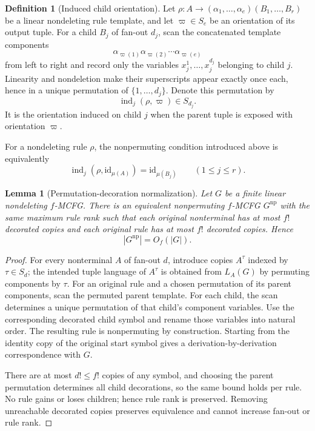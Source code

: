 \documentclass[11pt,a4paper]{article}
\numberwithin{equation}{section}
\theoremstyle{plain}
\newtheorem{lemma}[theorem]{Lemma}
\theoremstyle{definition}
\newtheorem{definition}[theorem]{Definition}
\theoremstyle{remark}
\begin{document}
\begin{definition}[Induced child orientation]
\label{def:induced-orientation}
Let
\(\rho:A\to(\alpha_1,\ldots,\alpha_e)(B_1,\ldots,B_r)\)
be a linear nondeleting rule template, and let
\(\varpi\in S_e\) be an orientation of its output tuple.  For a child \(B_j\)
of fan-out \(d_j\), scan the concatenated template components
\[
  \alpha_{\varpi(1)}\alpha_{\varpi(2)}\cdots\alpha_{\varpi(e)}
\]
from left to right and record only the variables
\(x_j^1,\ldots,x_j^{d_j}\) belonging to child \(j\).  Linearity and
nondeletion make their superscripts appear exactly once each, hence in a
unique permutation of \(\{1,\ldots,d_j\}\).  Denote this permutation by
\[
  \operatorname{ind}_j(\rho,\varpi)\in S_{d_j}.
\]
It is the orientation induced on child \(j\) when the parent tuple is exposed
with orientation \(\varpi\).
\end{definition}

For a nondeleting rule \(\rho\), the nonpermuting condition introduced above
is equivalently
\[
  \operatorname{ind}_j(\rho,\mathrm{id}_{\mu(A)})
  =\mathrm{id}_{\mu(B_j)}
  \qquad(1\le j\le r).
\]

\begin{lemma}[Permutation-decoration normalization]
\label{lem:permutation-decoration}
Let \(G\) be a finite linear nondeleting \(f\)-MCFG.  There is an equivalent
nonpermuting \(f\)-MCFG \(G^{\mathrm{np}}\) with the same maximum rule rank
such that each original nonterminal has at most \(f!\) decorated copies and
each original rule has at most \(f!\) decorated copies.  Hence
\[
  |G^{\mathrm{np}}|=O_f(|G|).
\]
\end{lemma}

\begin{proof}
For every nonterminal \(A\) of fan-out \(d\), introduce copies
\(A^\tau\) indexed by \(\tau\in S_d\); the intended tuple language of
\(A^\tau\) is obtained from \(L_A(G)\) by permuting components by \(\tau\).
For an original rule and a chosen permutation of its parent components, scan
the permuted parent template.  For each child, the scan determines a unique
permutation of that child's component variables.  Use the corresponding
decorated child symbol and rename those variables into natural order.  The
resulting rule is nonpermuting by construction.  Starting from the identity
copy of the original start symbol gives a derivation-by-derivation
correspondence with \(G\).

There are at most \(d!\le f!\) copies of any symbol, and choosing the parent
permutation determines all child decorations, so the same bound holds per
rule.  No rule gains or loses children; hence rule rank is preserved.
Removing unreachable decorated copies preserves equivalence and cannot
increase fan-out or rule rank.
\end{proof}
\end{document}
